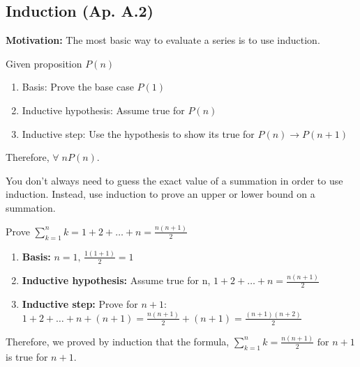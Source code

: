 \subsection{Induction (Ap. A.2)}
    \textbf{Motivation:} The most basic way to evaluate a series is to use induction.
    \begin{process}
        Given proposition $P(n)$
        \begin{enumerate}
            \item Basis: Prove the base case $P(1)$
            \item Inductive hypothesis: Assume true for $P(n)$
            \item Inductive step: Use the hypothesis to show its true for $P(n) \rightarrow P(n+1)$
        \end{enumerate}
        Therefore, $\forall \; n P(n)$.
    \end{process}

    \begin{intuition}
        You don't always need to guess the exact value of a summation in order to use induction. Instead, use induction to prove an upper or lower bound on a summation.
    \end{intuition}

    \begin{example}
        Prove $\sum_{k=1}^{n} k = 1 + 2 + \ldots + n = \frac{n(n+1)}{2}$
        \begin{enumerate}
            \item \textbf{Basis:} $n=1 \text{, } \frac{1(1+1)}{2} = 1$
            \item \textbf{Inductive hypothesis:} Assume true for n, $1 + 2 + \ldots + n = \frac{n(n+1)}{2}$
            \item \textbf{Inductive step:} Prove for $n+1$: $1 + 2 + \ldots + n + (n+1) = \frac{n(n+1)}{2} + (n+1) = \frac{(n+1)(n+2)}{2}$
        \end{enumerate}
        Therefore, we proved by induction that the formula, $\sum_{k=1}^{n} k = \frac{n(n+1)}{2} \text{ for } n+1$ is true for $n+1$.
    \end{example}

